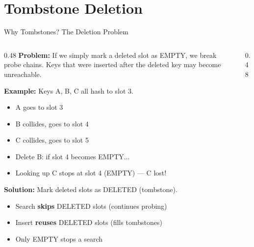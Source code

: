 \documentclass[aspectratio=169, 10pt]{beamer}
\begin{document}
\section{Tombstone Deletion}

\begin{frame}{Why Tombstones? The Deletion Problem}
\begin{columns}[T]
\begin{column}{0.48\textwidth}
\textbf{Problem:} If we simply mark a deleted slot as EMPTY,
we break probe chains. Keys that were inserted after the
deleted key may become unreachable.

\vspace{0.5em}
\textbf{Example:} Keys A, B, C all hash to slot 3.
\begin{itemize}
  \item A goes to slot 3
  \item B collides, goes to slot 4
  \item C collides, goes to slot 5
  \item Delete B: if slot 4 becomes EMPTY...
  \item Looking up C stops at slot 4 (EMPTY) --- C lost!
\end{itemize}

\vspace{0.5em}
\textbf{Solution:} Mark deleted slots as DELETED (tombstone).
\begin{itemize}
  \item Search \textbf{skips} DELETED slots (continues probing)
  \item Insert \textbf{reuses} DELETED slots (fills tombstones)
  \item Only EMPTY stops a search
\end{itemize}
\end{column}

\begin{column}{0.48\textwidth}
\begin{center}
\end{center}
\end{column}
\end{columns}
\end{frame}
\end{document}
